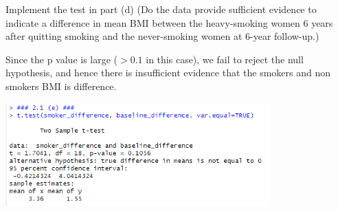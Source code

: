 Implement the test in part (d) (Do the data provide sufficient evidence to indicate a
difference in mean BMI between the heavy-smoking women 6 years after quitting smoking
and the never-smoking women at 6-year follow-up.)

\soln* Since the p value is large ($> 0.1$ in this case), we fail to reject the null hypothesis, and hence there is insufficient evidence that the smokers and non smokers BMI is difference. 

\nl \includegraphics*[width=4in]{img/2_1e_console.PNG}
